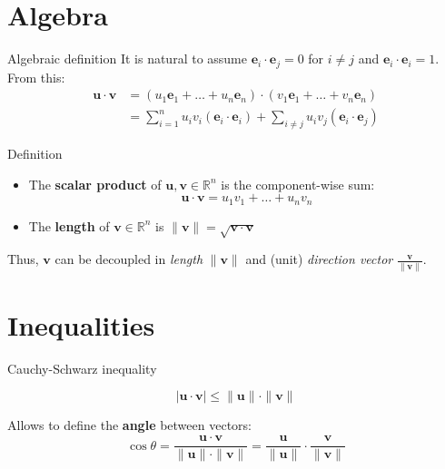 \documentclass[10pt]{beamer}
\begin{document}
\section{Algebra}
\begin{frame}{Algebraic definition}
    It is natural to assume $\mathbf e_i \cdot \mathbf e_j = 0$ for $i \neq j$ and $\mathbf e_i \cdot \mathbf e_i = 1$. From this:
    \begin{align*}
    \mathbf u \cdot \mathbf v &= (u_1 \mathbf e_1 + \dots + u_n \mathbf e_n) \cdot (v_1 \mathbf e_1 + \dots + v_n \mathbf e_n) \\
    &= \sum\limits_{i=1}^n u_i v_i (\mathbf e_i \cdot \mathbf e_i) + \sum\limits_{i \neq j} u_i v_j (\mathbf e_i \cdot \mathbf e_j)
    \end{align*}

    \begin{block}{Definition}
    \begin{itemize}
        \item The \textbf{scalar product} of $\mathbf u, \mathbf v \in \mathbb R^n$ is the component-wise sum:
        $$\mathbf u \cdot \mathbf v = u_1 v_1 + \dots + u_n v_n$$
        \item The \textbf{length} of $\mathbf v \in \mathbb R^n$ is $\|\mathbf v\| = \sqrt{\mathbf v \cdot \mathbf v}$
    \end{itemize}
    \end{block}
    Thus, $\mathbf v$ can be decoupled in \textit{length} $\|\mathbf v\|$ and (unit) \textit{direction vector} $\frac{\mathbf v}{\|\mathbf v\|}$.
\end{frame}

\section{Inequalities}
\begin{frame}{Cauchy-Schwarz inequality}
    \begin{center}
        
    \end{center}
    $$|\mathbf u \cdot \mathbf v| \leq \|\mathbf u\| \cdot \|\mathbf v \|$$

    Allows to define the \textbf{angle} between vectors: $$\cos \theta = \frac{\mathbf u \cdot \mathbf v}{\|\mathbf u\| \cdot \|\mathbf v\|} = \frac{\mathbf u}{\|\mathbf u\|} \cdot \frac{\mathbf v}{\|\mathbf v\|}$$
\end{frame}
\end{document}
